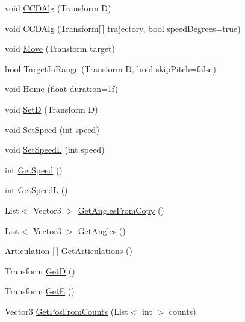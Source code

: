 \begin{DoxyCompactItemize}
\item 
void \mbox{\hyperlink{class_i_k_aa28704730e12709936ba319e326a4173}{C\+C\+D\+Alg}} (Transform D)
\item 
void \mbox{\hyperlink{class_i_k_a647580fce8d20924d081e6c056495e95}{C\+C\+D\+Alg}} (Transform\mbox{[}$\,$\mbox{]} trajectory, bool speed\+Degrees=true)
\item 
void \mbox{\hyperlink{class_i_k_a9959bf459122a560124c9aac8191cbe6}{Move}} (Transform target)
\item 
bool \mbox{\hyperlink{class_i_k_ad97122f89dfb2c5bff5605cbcf5c5cc7}{Target\+In\+Range}} (Transform D, bool skip\+Pitch=false)
\item 
void \mbox{\hyperlink{class_i_k_a1a8f3eb230e800c10dec985b81623121}{Home}} (float duration=1f)
\item 
void \mbox{\hyperlink{class_i_k_aa97be23f240e84f80c9d1709877e46f4}{SetD}} (Transform D)
\item 
void \mbox{\hyperlink{class_i_k_af3fe9338cf146836289725c4d7f001ff}{Set\+Speed}} (int speed)
\item 
void \mbox{\hyperlink{class_i_k_afc1472fadfc08f9df7374af09ca83110}{Set\+SpeedL}} (int speed)
\item 
int \mbox{\hyperlink{class_i_k_a4560c82ff2f46414e095e7fb37283f39}{Get\+Speed}} ()
\item 
int \mbox{\hyperlink{class_i_k_ae3121a6a82a3ae9216c480d4e9f117a9}{Get\+SpeedL}} ()
\item 
List$<$ Vector3 $>$ \mbox{\hyperlink{class_i_k_a041e3cba939af2806b7af200edf3161c}{Get\+Angles\+From\+Copy}} ()
\item 
List$<$ Vector3 $>$ \mbox{\hyperlink{class_i_k_a47ceb1a675024943c1714072b1b0d01f}{Get\+Angles}} ()
\item 
\mbox{\hyperlink{class_articulation}{Articulation}} \mbox{[}$\,$\mbox{]} \mbox{\hyperlink{class_i_k_ae8f0fe38cdc7d2280fc4c9343176810a}{Get\+Articulations}} ()
\item 
Transform \mbox{\hyperlink{class_i_k_aa7d322903f3e24412e87ec8b8f9281a0}{GetD}} ()
\item 
Transform \mbox{\hyperlink{class_i_k_a706f81d48d5c7d00791a78b8d09e923e}{GetE}} ()
\item 
Vector3 \mbox{\hyperlink{class_i_k_a265ad7e93d155fb6183a60baa8d97b4d}{Get\+Pos\+From\+Counts}} (List$<$ int $>$ counts)
\end{DoxyCompactItemize}
